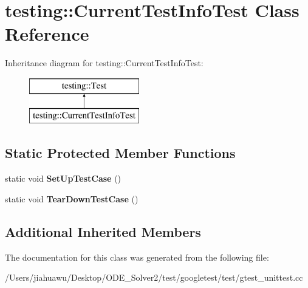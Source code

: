 \hypertarget{classtesting_1_1_current_test_info_test}{}\section{testing\+:\+:Current\+Test\+Info\+Test Class Reference}
\label{classtesting_1_1_current_test_info_test}
Inheritance diagram for testing\+:\+:Current\+Test\+Info\+Test\+:\begin{figure}[H]
\begin{center}
\leavevmode
\includegraphics[height=2.000000cm]{classtesting_1_1_current_test_info_test}
\end{center}
\end{figure}
\subsection*{Static Protected Member Functions}
\begin{DoxyCompactItemize}
\item 
\mbox{\label{classtesting_1_1_current_test_info_test_a61bad7ce29923afd464daf9684b6269e}} 
static void {\bfseries Set\+Up\+Test\+Case} ()
\item 
\mbox{\label{classtesting_1_1_current_test_info_test_a9a80a5a3e6e70c619870c2ae9df892a6}} 
static void {\bfseries Tear\+Down\+Test\+Case} ()
\end{DoxyCompactItemize}
\subsection*{Additional Inherited Members}


The documentation for this class was generated from the following file\+:\begin{DoxyCompactItemize}
\item 
/\+Users/jiahuawu/\+Desktop/\+O\+D\+E\+\_\+\+Solver2/test/googletest/test/gtest\+\_\+unittest.\+cc\end{DoxyCompactItemize}
